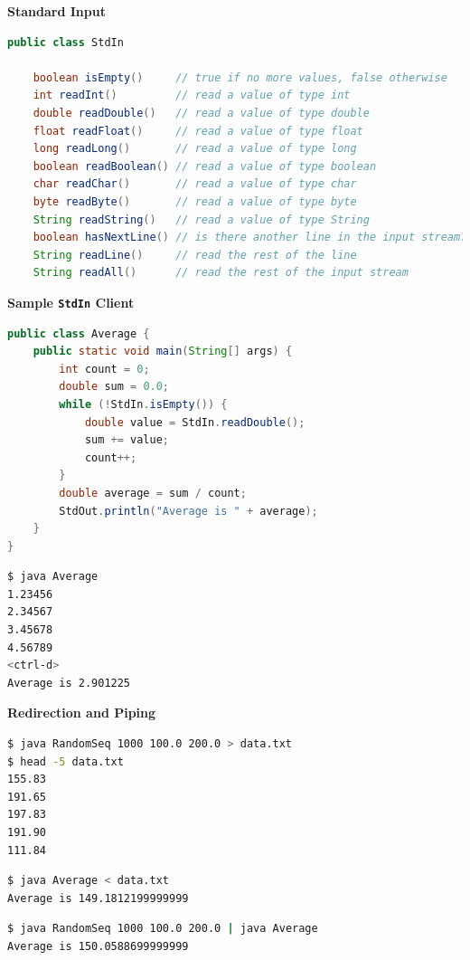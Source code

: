 \documentclass[8pt,a4paper,compress]{beamer}
\begin{document}
\begin{frame}[fragile]
\pause

\textbf{Standard Input}

\begin{lstlisting}[language=Java]
public class StdIn

    boolean isEmpty()     // true if no more values, false otherwise
    int readInt()         // read a value of type int
    double readDouble()   // read a value of type double
    float readFloat()     // read a value of type float
    long readLong()       // read a value of type long
    boolean readBoolean() // read a value of type boolean
    char readChar()       // read a value of type char
    byte readByte()       // read a value of type byte
    String readString()   // read a value of type String
    boolean hasNextLine() // is there another line in the input stream?
    String readLine()     // read the rest of the line
    String readAll()      // read the rest of the input stream
\end{lstlisting}

\pause
\smallskip

\textbf{Sample \lstinline$StdIn$ Client}

\begin{lstlisting}[language=Java]
public class Average { 
    public static void main(String[] args) { 
        int count = 0; 
        double sum = 0.0;
        while (!StdIn.isEmpty()) {
            double value = StdIn.readDouble();
            sum += value;
            count++;
        }
        double average = sum / count;
        StdOut.println("Average is " + average);
    }
}
\end{lstlisting}
\end{frame}

\begin{frame}[fragile]
\pause

\begin{lstlisting}[language=bash]
$ java Average
1.23456
2.34567
3.45678
4.56789
<ctrl-d>
Average is 2.901225
\end{lstlisting}

\pause
\smallskip

\textbf{Redirection and Piping}

\begin{lstlisting}[language=bash]
$ java RandomSeq 1000 100.0 200.0 > data.txt
$ head -5 data.txt
155.83
191.65
197.83
191.90
111.84
\end{lstlisting}

\begin{lstlisting}[language=bash]
$ java Average < data.txt
Average is 149.1812199999999
\end{lstlisting}

\begin{lstlisting}[language=bash]
$ java RandomSeq 1000 100.0 200.0 | java Average
Average is 150.0588699999999
\end{lstlisting}

\end{frame}
\end{document}
